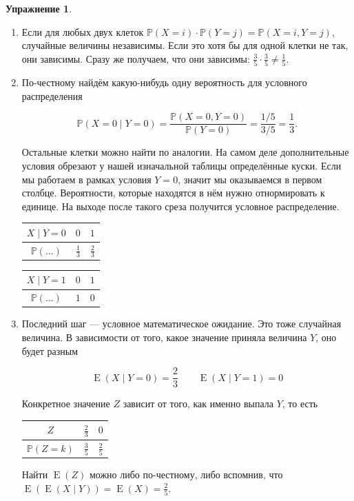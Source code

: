 \documentclass[12pt, a4paper, oneside]{extreport}
\DeclareMathOperator{\E}{\mathop{E}}
\def \mbb{\mathbb}
\def \PP{\mbb{P}}
\theoremstyle{plain}              %
\theoremstyle{definition}         %
\newtheorem{problem}{\color{myblue} Упражнение}
\begin{document}
\begin{problem}
\begin{sol}
\begin{enumerate}
	\item  Если для любых двух клеток $\PP(X=i) \cdot \PP(Y=j) = \PP(X = i, Y=j)$, случайные величины независимы. Если это хотя бы для одной клетки не так, они зависимы. Сразу же получаем, что они зависимы: $\frac{3}{5} \cdot \frac{3}{5}  \ne \frac{1}{5}$.
	
	\item  По-честному найдём какую-нибудь одну вероятность для условного распределения
	
	\[ \PP(X = 0 \mid Y = 0) = \frac{\PP(X = 0, Y = 0)}{\PP(Y = 0)} = \frac{1/5}{3/5} = \frac{1}{3}.\]
	
	Остальные клетки можно найти по аналогии. На самом деле дополнительные условия обрезают у нашей изначальной таблицы определённые куски. Если мы работаем в рамках условия $Y = 0$, значит мы оказываемся в первом столбце. Вероятности, которые находятся в нём нужно отнормировать к единице. На выходе после такого среза получится условное распределение. 
	
		\begin{minipage}[t]{0.45\textwidth}
		\begin{tabular}{c|c|c}
			$X \mid Y =0 $ &   $0 $    &  $1$   \\ \hline
			$\PP(\ldots) $   &  $\frac{1}{3}  $     &  $\frac{2}{3} $ 
		\end{tabular}
	\end{minipage}
	\begin{minipage}[t]{0.45\textwidth}
		\begin{tabular}{c|c|c}
		$X \mid Y =1 $&  $0$    &  $1$   \\ \hline
			$\PP(\ldots)$   & $ 1$     &  $0$ 
		\end{tabular}
	\end{minipage}	
		
	\item  Последний шаг --- условное математическое ожидание. Это тоже случайная величина. В зависимости от того, какое значение приняла величина $Y$, оно будет разным 
	
	\[ \E(X \mid Y=0) = \frac{2}{3} \qquad \E(X \mid Y = 1) = 0 \]
	
	Конкретное значение $Z$ зависит от того, как именно выпала $Y$, то есть 
	
	\begin{center}
	\begin{tabular}{c|c|c}
		$Z$ &  $ \frac{2}{3}$    &  $ 0 $   \\ \hline
		$\PP(Z=k)$   & $ \frac{3}{5} $     &  $\frac{2}{5}$ 
	\end{tabular}
	\end{center}

Найти $\E(Z)$ можно либо по-честному, либо вспомнив, что $\E(\E(X \mid Y)) = \E(X) = \frac{2}{5}$.
\end{enumerate}
\end{sol} 
\end{problem}
\end{document}
